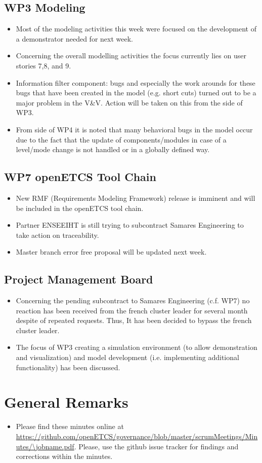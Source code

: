 \documentclass[a4paper, 11pt]{article}
\begin{document}
\subsection{WP3 Modeling}
\begin{itemize}
\item Most of the modeling activities this week were focused on the development of a demonstrator needed for next week.
\item Concerning the overall modelling activities the focus currently lies on user stories 7,8, and 9.
\item Information filter component: bugs and especially the work arounds for these bugs that have been created in the model (e.g. short cuts) turned out to be a major problem in the V\&V. Action will be taken on this from the side of WP3.
\item From side of WP4 it is noted that many behavioral bugs in the model occur due to the fact that the update of components/modules in case of a level/mode change is not handled or in a globally defined way.
\end{itemize}

\subsection{WP7 openETCS Tool Chain}
\begin{itemize}
\item New RMF (Requirements Modeling Framework) release is imminent and will be included in the openETCS tool chain.
\item Partner ENSEEIHT is still trying to subcontract Samares Engineering to take action on traceability.
\item Master branch error free proposal will be updated next week.
\end{itemize}

\subsection{Project Management Board}
\begin{itemize}
\item Concerning the pending subcontract to Samares Engineering (c.f. WP7) no reaction has been received from the french cluster leader for several month despite of repeated requests. Thus, It has been decided to bypass the french cluster leader.
\item The focus of WP3 creating a simulation environment (to allow demonstration and visualization) and model development (i.e. implementing additional functionality) has been discussed.
\end{itemize}


\section{General Remarks}

\begin{itemize}
\item Please find these minutes online at \url{https://github.com/openETCS/governance/blob/master/scrumMeetings/Minutes/\jobname.pdf}. Please, use the github issue tracker for findings and corrections within the minutes.
\end{itemize}
\end{document}
